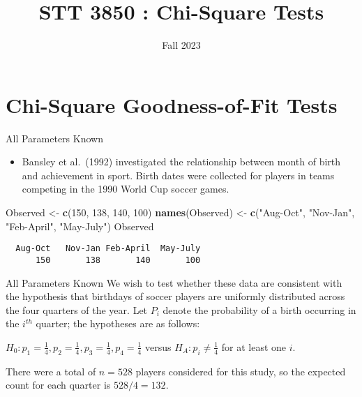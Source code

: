 \documentclass[
  ignorenonframetext,
]{beamer}
\title{STT 3850 : Chi-Square Tests}
\author{Fall 2023}
\date{}
\institute{Appalachian State University}
\newenvironment{Shaded}{\begin{snugshade}}{\end{snugshade}}
\newcommand{\DecValTok}[1]{\textcolor[rgb]{0.00,0.00,0.81}{#1}}
\newcommand{\FunctionTok}[1]{\textcolor[rgb]{0.13,0.29,0.53}{\textbf{#1}}}
\newcommand{\NormalTok}[1]{#1}
\newcommand{\OtherTok}[1]{\textcolor[rgb]{0.56,0.35,0.01}{#1}}
\newcommand{\StringTok}[1]{\textcolor[rgb]{0.31,0.60,0.02}{#1}}
\providecommand{\tightlist}{%
  \setlength{\itemsep}{0pt}\setlength{\parskip}{0pt}}
\begin{document}
\frame{\titlepage}

\hypertarget{chi-square-goodness-of-fit-tests}{%
\section{Chi-Square Goodness-of-Fit
Tests}\label{chi-square-goodness-of-fit-tests}}

\begin{frame}[fragile]{All Parameters Known}
\protect\hypertarget{all-parameters-known}{}
\begin{itemize}
\tightlist
\item
  Bansley et al.~(1992) investigated the relationship between month of
  birth and achievement in sport. Birth dates were collected for players
  in teams competing in the 1990 World Cup soccer games.
\end{itemize}

\begin{Shaded}
\begin{Highlighting}[]
\NormalTok{Observed }\OtherTok{\textless{}{-}} \FunctionTok{c}\NormalTok{(}\DecValTok{150}\NormalTok{, }\DecValTok{138}\NormalTok{, }\DecValTok{140}\NormalTok{, }\DecValTok{100}\NormalTok{)}
\FunctionTok{names}\NormalTok{(Observed) }\OtherTok{\textless{}{-}} \FunctionTok{c}\NormalTok{(}\StringTok{"Aug{-}Oct"}\NormalTok{, }\StringTok{"Nov{-}Jan"}\NormalTok{, }
                     \StringTok{"Feb{-}April"}\NormalTok{, }\StringTok{"May{-}July"}\NormalTok{)}
\NormalTok{Observed}
\end{Highlighting}
\end{Shaded}

\begin{verbatim}
  Aug-Oct   Nov-Jan Feb-April  May-July 
      150       138       140       100 
\end{verbatim}
\end{frame}

\begin{frame}{All Parameters Known}
\protect\hypertarget{all-parameters-known-1}{}
We wish to test whether these data are consistent with the hypothesis
that birthdays of soccer players are uniformly distributed across the
four quarters of the year. Let \(P_i\) denote the probability of a birth
occurring in the \(i^{th}\) quarter; the hypotheses are as follows:

\(H_0: p_1=\frac{1}{4}, p_2=\frac{1}{4}, p_3=\frac{1}{4}, p_4=\frac{1}{4}\)
versus \(H_A: p_i \neq \frac{1}{4}\) for at least one \(i\).

There were a total of \(n = 528\) players considered for this study, so
the expected count for each quarter is \(528/4 = 132\).
\end{frame}
\end{document}
